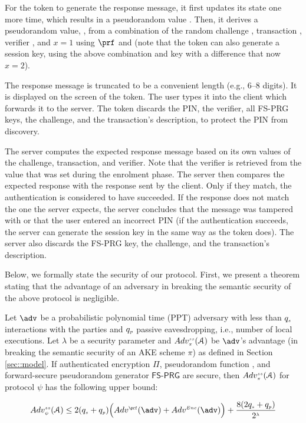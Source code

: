 For the token to generate the response message, it first updates its state one more time, which results in a pseudorandom value . Then, it derives a pseudorandom value, , from a combination of the random challenge \VM{\nonce}, transaction \VM{\trans}, verifier \VC{\verifier}, and $x=1$  using $\prf$ and  (note that the token can also generate a session key, using the above combination and key with a difference that now $x=2$). 

The response message is truncated to be a convenient length (e.g., 6--8 digits). It is displayed on the screen of the token. The user types it into the client which forwards it to the server. The token discards the PIN, the verifier, all FS-PRG keys, the challenge, and the transaction's description, to protect the PIN from discovery. 

The server computes the expected response message based on its own values of the challenge, transaction, and verifier. Note that the verifier is retrieved from the value that was set during the enrolment phase. The server then compares the expected response with the response sent by the client. Only if they match, the authentication is considered to have succeeded. If the response does not match the one the server expects, the server concludes that the message was tampered with or that the user entered an incorrect PIN (if the authentication succeeds, the server can generate the session key in the same way as the token does).  The server also discards the FS-PRG key, the challenge, and the transaction's description.

%
Below, we formally state the security of our protocol.  First, we present a theorem stating that the advantage of an adversary in breaking the semantic security of the above protocol is negligible.  
\begin{theorem}[Semantic Security]
Let $\adv$ be a probabilistic polynomial time (PPT) adversary with less than $q_{\scriptscriptstyle s}$ interactions with the parties and $q_{\scriptscriptstyle p}$ passive eavesdropping, i.e., number of local executions. Let $\lambda$ be a security parameter and $Adv_{\scriptscriptstyle\pi}^{\scriptscriptstyle ss}(\mathcal{A})$ be  $\adv$'s advantage (in breaking the semantic security of an AKE scheme $\pi$) as defined in Section \ref{sec::model}. If authenticated encryption $\Pi$, pseudorandom function \prf,  and forward-secure pseudorandom generator  $\mathsf{FS\text{-}PRG}$ are secure, then $Adv_{\scriptscriptstyle\pi}^{\scriptscriptstyle ss}(\mathcal{A})$ for protocol $\psi$ has the following upper bound:  

\begin{equation*} 
Adv_{\sss \psi}^{\sss ss}(\A) \leq 2(q_{\sss s}+q_{\sss p})\Big(Adv^{\sss\prf}(\adv)+Adv^{\sss Enc}(\adv)\Big)+\frac{8(2q_{\sss s}+q_{\sss p})}{2^{\sss\lambda}}
\end{equation*}
%
\end{theorem}

